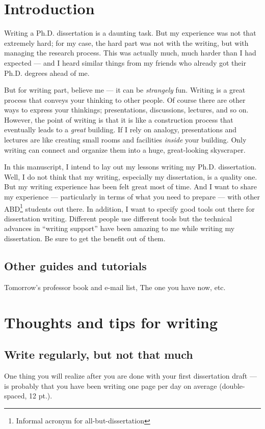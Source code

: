 \documentclass[11pt]{article}
\begin{document}
\section{Introduction}

Writing a Ph.D. dissertation is a daunting task. But my experience was not
that extremely hard; for my case, the hard part was not with the writing, but
with managing the research process. This was actually much, much harder than I
had expected --- and I heard similar things from my friends who already got
their Ph.D. degrees ahead of me.

But for writing part, believe me --- it can be \emph{strangely} fun.  Writing
is a great process that conveys your thinking to other people.  Of course
there are other ways to express your thinkings; presentations, discussions,
lectures, and so on.  However, the point of writing is that it is like a
construction process that eventually leads to a \emph{great} building.  If I
rely on analogy, presentations and lectures are like creating small rooms and
facilities \emph{inside} your building. Only writing can connect and organize
them into a huge, great-looking skyscraper.

In this manuscript, I intend to lay out my lessons writing my Ph.D.
dissertation. Well, I do not think that my writing, especially my
dissertation, is a quality one. But my writing experience has been felt great
most of time. And I want to share my experience --- particularly in terms of
what you need to prepare --- with other ABD\footnote{Informal acronym for
all-but-dissertation} students out there. In addition, I want to specify good
tools out there for dissertation writing.  Different people use different
tools but the technical advances in ``writing support'' have been amazing to
me while writing my dissertation.  Be sure to get the benefit out of them.

\subsection{Other guides and tutorials}
Tomorrow's professor book and e-mail list, The one you have now, etc.

\section{Thoughts and tips for writing}

\subsection{Write regularly, but not that much}
One thing you will realize after you are done with your first
dissertation draft --- is probably that you have been writing one
page per day on average (double-spaced, 12 pt.).
\end{document}
